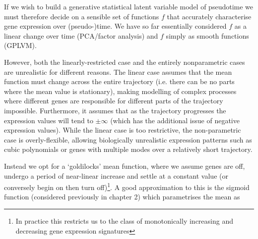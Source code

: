 
If we wish to build a generative statistical latent variable model of pseudotime we must therefore decide on a sensible set of functions $f$ that accurately characterise gene expression over (pseudo-)time. We have so far essentially considered $f$ as a linear change over time (PCA/factor analysis) and $f$ simply as smooth functions (GPLVM).

However, both the linearly-restricted case and the entirely nonparametric cases are unrealistic for different reasons. The linear case assumes that the mean function must change across the entire trajectory (i.e. there can be no parts where the mean value is stationary), making modelling of complex processes where different genes are responsible for different parts of the trajectory impossible. Furthermore, it assumes that as the trajectory progresses the expression values will tend to $\pm \infty$ (which has the additional issue of negative expression values). While the linear case is too restrictive, the non-parametric case is overly-flexible, allowing biologically unrealistic expression patterns such as cubic polynomials or genes with multiple modes over a relatively short trajectory.

Instead we opt for a `goldilocks' mean function, where we assume genes are off, undergo a period of near-linear increase and settle at a constant value (or conversely begin on then turn off)\footnote{In practice this restricts us to the class of monotonically increasing and decreasing gene expression signatures}. A good approximation to this is the sigmoid function (considered previously in chapter 2) which parametrises the mean as

